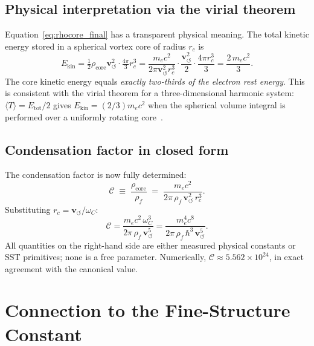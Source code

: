 \documentclass[11pt,a4paper]{article}
\newcommand{\rc}{r_c}
\newcommand{\vswirl}{\mathbf{v}_{\scriptscriptstyle\boldsymbol{\circlearrowleft}}}
\newcommand{\rhof}{\rho_{\!f}}
\newcommand{\rhocore}{\rho_{\!\mathrm{core}}}
\newcommand{\omC}{\omega_C}
\begin{document}
\subsection{Physical interpretation via the virial theorem}

Equation~\eqref{eq:rhocore_final} has a transparent physical meaning.
The total kinetic energy stored in a spherical vortex core of
radius $\rc$ is
\begin{equation}
  E_{\mathrm{kin}}
  = \tfrac{1}{2}\rhocore\vswirl^2 \cdot \tfrac{4\pi}{3}\rc^3
  = \frac{m_e c^2}{2\pi\vswirl^2\rc^3}
    \cdot\frac{\vswirl^2}{2}\cdot\frac{4\pi\rc^3}{3}
  = \frac{2\,m_e c^2}{3}.
  \label{eq:Ekin_core}
\end{equation}
The core kinetic energy equals \emph{exactly two-thirds of the electron
rest energy}.  This is consistent with the virial theorem for a
three-dimensional harmonic system: $\langle T\rangle = E_{\mathrm{tot}}/2$
gives $E_{\mathrm{kin}}=(2/3)m_ec^2$ when the spherical volume
integral is performed over a uniformly rotating
core~\cite{LandauMechanics}.

\subsection{Condensation factor in closed form}

The condensation factor is now fully determined:
\begin{equation}
  \mathcal{C}
  \;\equiv\; \frac{\rhocore}{\rhof}
  \;=\; \frac{m_e c^2}{2\pi\,\rhof\,\vswirl^2\,\rc^3}.
  \label{eq:C_closed}
\end{equation}
Substituting $\rc=\vswirl/\omC$:
\begin{equation}
  \mathcal{C}
  = \frac{m_e c^2\,\omC^3}{2\pi\,\rhof\,\vswirl^5}
  = \frac{m_e^4 c^8}{2\pi\,\rhof\,\hbar^3\,\vswirl^5}.
  \label{eq:C_primitives}
\end{equation}
All quantities on the right-hand side are either measured physical
constants or SST primitives; none is a free parameter.
Numerically, $\mathcal{C}\approx5.562\times10^{24}$, in exact
agreement with the canonical value.

\section{Connection to the Fine-Structure Constant}
\end{document}
